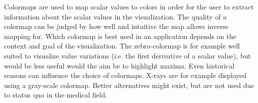 

Colormaps are used to map scalar values to colors in order for the user to extract information about the scalar values in the visualization. The quality of a colormap can be judged by how well and intuitive the map allows inverse mapping for. Which colormap is best used in an application depends on the context and goal of the visualization. The zebra-colormap is for example well suited to visualize value variations (i.e. the first derivative of a scalar value), but would be less useful would the aim be to highlight maxima. Even historical reasons can influence the choice of colormaps. X-rays are for example displayed using a gray-scale colormap. Better alternatives might exist, but are not used due to status quo in the medical field.




















	

